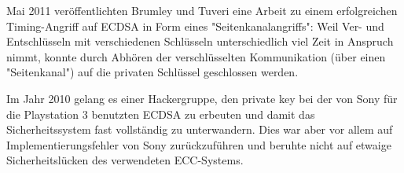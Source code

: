 \begin{bem}
	Mai 2011 veröffentlichten Brumley und Tuveri eine Arbeit zu einem erfolgreichen Timing-Angriff auf ECDSA in Form eines "Seitenkanalangriffs":
	Weil Ver- und Entschlüsseln mit verschiedenen Schlüsseln unterschiedlich viel Zeit in Anspruch nimmt, konnte durch Abhören der verschlüsselten Kommunikation (über einen "Seitenkanal") auf die privaten Schlüssel geschlossen werden.
\end{bem}

\begin{bem}
	Im Jahr 2010 gelang es einer Hackergruppe, den private key bei der von Sony für die Playstation 3 benutzten ECDSA zu erbeuten und damit das Sicherheitssystem fast vollständig zu unterwandern.
	Dies war aber vor allem auf Implementierungsfehler von Sony zurückzuführen und beruhte nicht auf etwaige Sicherheitslücken des verwendeten ECC-Systems.
\end{bem}
